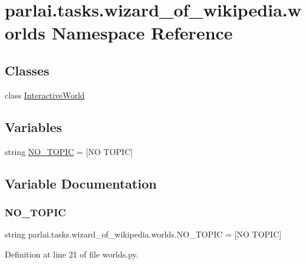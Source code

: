 \hypertarget{namespaceparlai_1_1tasks_1_1wizard__of__wikipedia_1_1worlds}{}\section{parlai.\+tasks.\+wizard\+\_\+of\+\_\+wikipedia.\+worlds Namespace Reference}
\label{namespaceparlai_1_1tasks_1_1wizard__of__wikipedia_1_1worlds}
\subsection*{Classes}
\begin{DoxyCompactItemize}
\item 
class \hyperlink{classparlai_1_1tasks_1_1wizard__of__wikipedia_1_1worlds_1_1InteractiveWorld}{Interactive\+World}
\end{DoxyCompactItemize}
\subsection*{Variables}
\begin{DoxyCompactItemize}
\item 
string \hyperlink{namespaceparlai_1_1tasks_1_1wizard__of__wikipedia_1_1worlds_a0f69c924405763d8304b2602530b1ba1}{N\+O\+\_\+\+T\+O\+P\+IC} = \textquotesingle{}\mbox{[}NO T\+O\+P\+IC\mbox{]}\textquotesingle{}
\end{DoxyCompactItemize}


\subsection{Variable Documentation}
\mbox{\label{namespaceparlai_1_1tasks_1_1wizard__of__wikipedia_1_1worlds_a0f69c924405763d8304b2602530b1ba1}} 
\subsubsection{\texorpdfstring{N\+O\+\_\+\+T\+O\+P\+IC}{NO\_TOPIC}}
{\footnotesize\ttfamily string parlai.\+tasks.\+wizard\+\_\+of\+\_\+wikipedia.\+worlds.\+N\+O\+\_\+\+T\+O\+P\+IC = \textquotesingle{}\mbox{[}NO T\+O\+P\+IC\mbox{]}\textquotesingle{}}



Definition at line 21 of file worlds.\+py.


